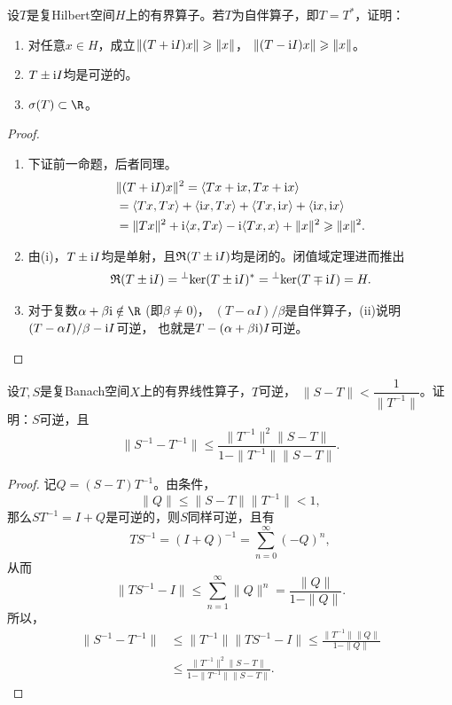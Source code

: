 \begin{8}设$T$是复Hilbert空间$H$上的有界算子。若$T$为自伴算子，即$T=T^*$，证明：
    \begin{enumerate}[label=(\roman*)]
        \item 对任意$x \in H$，成立$\|(T+{\rm i}I)x\|\geqslant\|x\|$，
        $\|(T-{\rm i}I)x\|\geqslant\|x\|$。
        \item $T\pm{\rm i}I$均是可逆的。
        \item $\s(T)\subset\R$。
    \end{enumerate}
\end{8}
\begin{proof}
    \begin{enumerate}[label=(\roman*)]
    \item 下证前一命题，后者同理。
    \begin{align*}
        &\|(T+{\rm i}I)x\|^2=\langle Tx+{\rm i}x,Tx+{\rm i}x \rangle\\
        &=\langle Tx,Tx \rangle+\langle {\rm i}x,Tx \rangle
        +\langle Tx,{\rm i}x \rangle+\langle {\rm i}x,{\rm i}x \rangle\\
        &=\|Tx\|^2+{\rm i}\langle x,Tx \rangle-{\rm i}\langle Tx,x \rangle+\|x\|^2
        \geqslant\|x\|^2.
    \end{align*}
    \item 由(i)，$T\pm{\rm i}I$均是单射，且$\mathfrak{R}(T\pm{\rm i}I)$均是闭的。闭值域定理进而推出
    \[\mathfrak{R}(T\pm{\rm i}I)={ }^\perp\!\ker(T\pm{\rm i}I)^*={ }^\perp\!\ker(T\mp{\rm i}I)=H.\]
    \item 对于复数$\alpha+\beta{\rm i}\notin\R$ (即$\beta\ne0$)，
    $(T-\alpha I)/\beta$是自伴算子，(ii)说明$(T-\alpha I)/\beta-{\rm i}I$可逆，
    也就是$T-(\alpha+\beta{\rm i})I$可逆。\qedhere
    \end{enumerate}
\end{proof}

\begin{9}
    设$T,S$是复Banach空间$X$上的有界线性算子，$T$可逆，
    $\|S-T\|<\dfrac{1}{\|T^{-1}\|}$。证明：$S$可逆，且
    \[\|S^{-1}-T^{-1}\|\leqslant\frac{\|T^{-1}\|^2\|S-T\|}{1-\|T^{-1}\|\|S-T\|}.\]
\end{9}
\begin{proof}
    记$Q=(S-T)T^{-1}$。由条件，
    \[\|Q\|\leqslant\|S-T\|\|T^{-1}\|<1,\]
    那么$ST^{-1}=I+Q$是可逆的，则$S$同样可逆，且有
    \[TS^{-1}=(I+Q)^{-1}=\sum_{n=0}^\infty(-Q)^n,\]
    从而\[\|TS^{-1}-I\|\leqslant\sum_{n=1}^\infty\|Q\|^n=\frac{\|Q\|}{1-\|Q\|}.\]
    所以，
    \begin{align*}
        \|S^{-1}-T^{-1}\|&\leqslant\|T^{-1}\|\|TS^{-1}-I\|
        \leqslant\frac{\|T^{-1}\|\|Q\|}{1-\|Q\|}\\
        &\leqslant\frac{\|T^{-1}\|^2\|S-T\|}{1-\|T^{-1}\|\|S-T\|}.
    \end{align*}
\end{proof}

